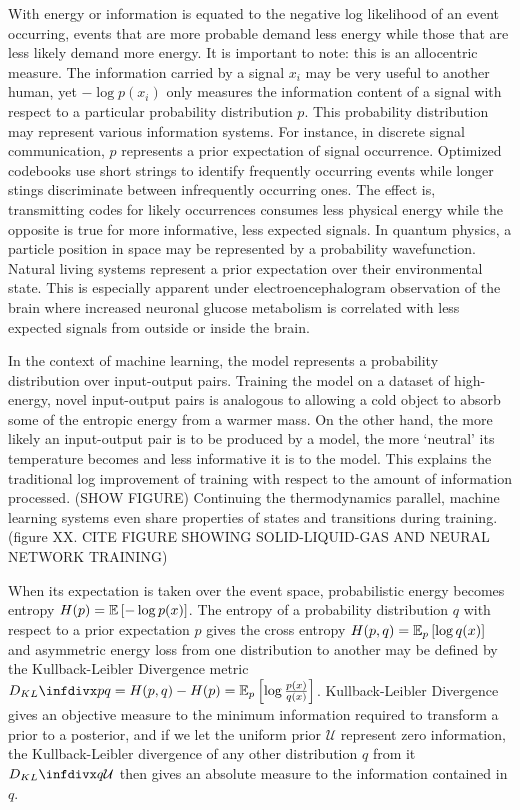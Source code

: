 \documentclass{article}
\begin{document}
With energy or information is equated to the negative log likelihood of an event occurring, events that are more probable demand less energy while those that are less likely demand more energy. It is important to note: this is an allocentric measure. The information carried by a signal $x_i$ may be very useful to another human, yet $- \log{p(x_i)}$ only measures the information content of a signal with respect to a particular probability distribution $p$. This probability distribution may represent various information systems. For instance, in discrete signal communication, $p$ represents a prior expectation of signal occurrence. Optimized codebooks use short strings to identify frequently occurring events while longer stings discriminate between infrequently occurring ones. The effect is, transmitting codes for likely occurrences consumes less physical energy while the opposite is true for more informative, less expected signals. In quantum physics, a particle position in space may be represented by a probability wavefunction. Natural living systems represent a prior expectation over their environmental state. 
This is especially apparent under electroencephalogram observation of the brain where increased neuronal glucose metabolism is correlated with less expected signals from outside or inside the brain. 

In the context of machine learning, the model represents a probability distribution over input-output pairs. Training the model on a dataset of high-energy, novel input-output pairs is analogous to allowing a cold object to absorb some of the entropic energy from a warmer mass. On the other hand, the more likely an input-output pair is to be produced by a model, the more ‘neutral’ its temperature becomes and less informative it is to the model. This explains the traditional log improvement of training with respect to the amount of information processed. (SHOW FIGURE) Continuing the thermodynamics parallel, machine learning systems even share properties of states and transitions during training. (figure XX. CITE FIGURE SHOWING SOLID-LIQUID-GAS AND NEURAL NETWORK TRAINING)

When its expectation is taken over the event space, probabilistic energy becomes entropy $H(p) = \expectation{-\log{p(x)}}$. The entropy of a probability distribution $q$ with respect to a prior expectation $p$ gives the cross entropy $H(p,q) = \expectation[p]{ \log{ q(x) } }$ and asymmetric energy loss from one distribution to another may be defined by the Kullback-Leibler Divergence metric $\kld{p}{q} = H(p,q) - H(p) = \expectation[p]{ \log {\frac {p(x)}{q(x)} } }$. Kullback-Leibler Divergence gives an objective measure to the minimum information required to transform a prior to a posterior, and if we let the uniform prior $\mathcal{U}$ represent zero information, the Kullback-Leibler divergence of any other distribution $q$ from it $\kld{q}{\mathcal{U}}$ then gives an absolute measure to the information contained in $q$. 
\end{document}
